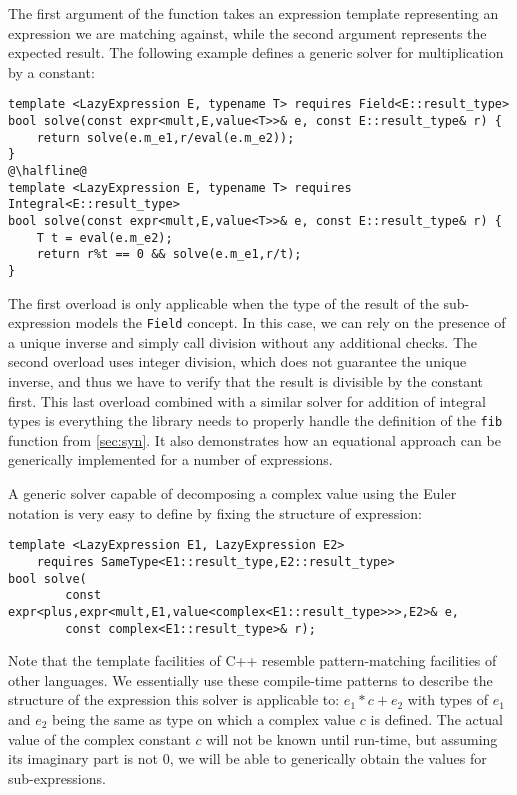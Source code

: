 \documentclass{llncs}
\makeatletter
\DeclareRobustCommand{\code}[1]{{\lstinline[keepspaces,breaklines=false,escapechar=@]{#1}}}
\makeatother
\begin{document}
The first argument of the function takes an expression template representing an 
expression we are matching against, while the second argument represents the 
expected result. The following example defines a generic solver for 
multiplication by a constant:

\begin{lstlisting}[keepspaces]
template <LazyExpression E, typename T> requires Field<E::result_type>
bool solve(const expr<mult,E,value<T>>& e, const E::result_type& r) {
    return solve(e.m_e1,r/eval(e.m_e2));
}
@\halfline@
template <LazyExpression E, typename T> requires Integral<E::result_type>
bool solve(const expr<mult,E,value<T>>& e, const E::result_type& r) {
    T t = eval(e.m_e2);
    return r%t == 0 && solve(e.m_e1,r/t);
}
\end{lstlisting}

\noindent
The first overload is only applicable when the type of the result of the 
sub-expression models the \code{Field} concept. In this case, we can rely on the presence 
of a unique inverse and simply call division without any additional checks. The 
second overload uses integer division, which does not guarantee the unique 
inverse, and thus we have to verify that the result is divisible by the constant 
first. This last overload combined with a similar solver for addition of 
integral types is everything the library needs to properly handle the definition 
of the \code{fib} function from \textsection\ref{sec:syn}. It also demonstrates 
how an equational approach can be generically implemented for a number of 
expressions.

A generic solver capable of decomposing a complex value using the Euler 
notation is very easy to define by fixing the structure of expression:

\begin{lstlisting}[keepspaces]
template <LazyExpression E1, LazyExpression E2> 
    requires SameType<E1::result_type,E2::result_type>
bool solve(
        const expr<plus,expr<mult,E1,value<complex<E1::result_type>>>,E2>& e, 
        const complex<E1::result_type>& r);
\end{lstlisting}

\noindent
Note that the template facilities of C++ resemble pattern-matching facilities of 
other languages. We essentially use these compile-time patterns to describe the 
structure of the expression this solver is applicable to: $e_1*c+e_2$ with types 
of $e_1$ and $e_2$ being the same as type on which a complex value $c$ is 
defined. The actual value of the complex constant $c$ will not be known until 
run-time, but assuming its imaginary part is not $0$, we will be able to 
generically obtain the values for sub-expressions.
\end{document}
